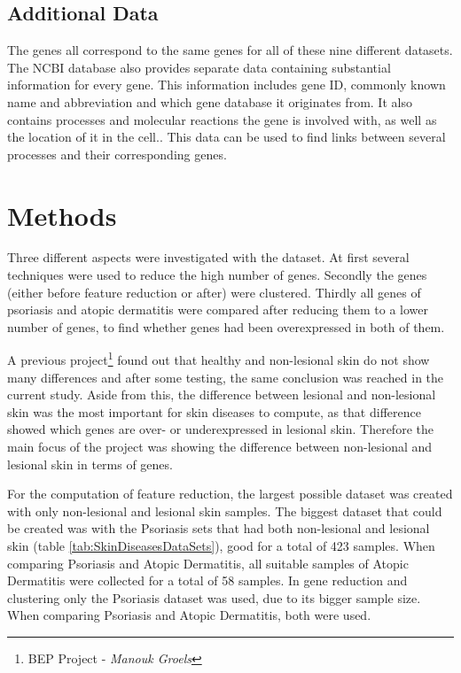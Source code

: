 \documentclass[10pt,a4paper]{article}
\begin{document}
	\subsection{Additional Data}
	\label{subsec:AdditionalData}
	
	The genes all correspond to the same genes for all of these nine different datasets. The NCBI database\cite{edgar2002gene} also provides separate data containing substantial information for every gene. This information includes gene ID, commonly known name and abbreviation and which gene database it originates from. It also contains processes and molecular reactions the gene is involved with, as well as the location of it in the cell.. This data can be used to find links between several processes and their corresponding genes.
	
	\section{Methods}
	\label{sec:Methods}
	
	Three different aspects were investigated with the dataset. At first several techniques were used to reduce the high number of genes. Secondly the genes (either before feature reduction or after) were clustered. Thirdly all genes of psoriasis and atopic dermatitis were compared after reducing them to a lower number of genes, to find whether genes had been overexpressed in both of them.
	
	A previous project\footnote{BEP Project -\textit{ Manouk Groels}} found out that healthy and non-lesional skin do not show many differences and after some testing, the same conclusion was reached in the current study. Aside from this, the difference between lesional and non-lesional skin was the most important for skin diseases to compute, as that difference showed which genes are over- or underexpressed in lesional skin. Therefore the main focus of the project was showing the difference between non-lesional and lesional skin in terms of genes. 
	
	For the computation of feature reduction, the largest possible dataset was created with only non-lesional and lesional skin samples. The biggest dataset that could be created was with the Psoriasis sets that had both non-lesional and lesional skin (table \ref{tab:SkinDiseasesDataSets}), good for a total of 423 samples. When comparing Psoriasis and Atopic Dermatitis, all suitable samples of Atopic Dermatitis were collected for a total of 58 samples. In gene reduction and clustering only the Psoriasis dataset was used, due to its bigger sample size. When comparing Psoriasis and Atopic Dermatitis, both were used.
	
\end{document}
